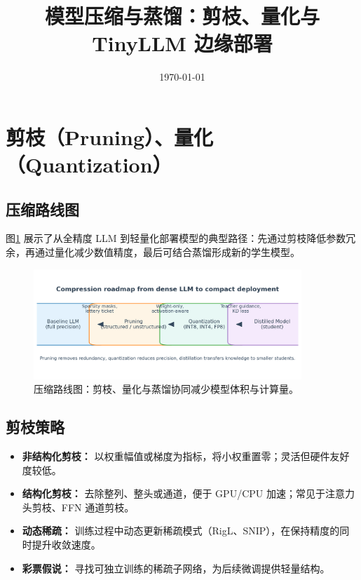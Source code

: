 \documentclass[UTF8,zihao=-4]{ctexart}
\title{模型压缩与蒸馏：剪枝、量化与 TinyLLM 边缘部署}
\author{}
\date{\today}
\begin{document}
\maketitle

\section{剪枝（Pruning）、量化（Quantization）}
\subsection{压缩路线图}
图\ref{fig:compression_landscape_cn} 展示了从全精度 LLM 到轻量化部署模型的典型路径：先通过剪枝降低参数冗余，再通过量化减少数值精度，最后可结合蒸馏形成新的学生模型。
\begin{figure}[H]
  \centering
  \includegraphics[width=0.9\textwidth]{compression_landscape.png}
  \caption{压缩路线图：剪枝、量化与蒸馏协同减少模型体积与计算量。}
  \label{fig:compression_landscape_cn}
\end{figure}

\subsection{剪枝策略}
\begin{itemize}
  \item \textbf{非结构化剪枝：} 以权重幅值或梯度为指标，将小权重置零；灵活但硬件友好度较低。
  \item \textbf{结构化剪枝：} 去除整列、整头或通道，便于 GPU/CPU 加速；常见于注意力头剪枝、FFN 通道剪枝。
  \item \textbf{动态稀疏：} 训练过程中动态更新稀疏模式（RigL、SNIP），在保持精度的同时提升收敛速度。
  \item \textbf{彩票假说：} 寻找可独立训练的稀疏子网络，为后续微调提供轻量结构。
\end{itemize}
\end{document}
